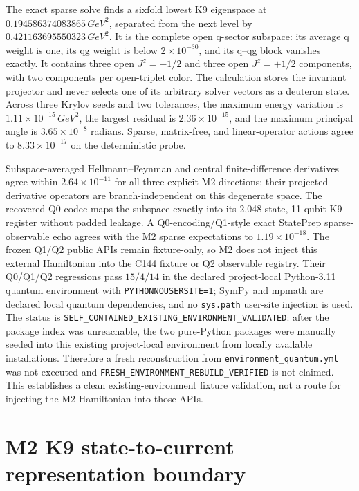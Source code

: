 \documentclass[11pt,oneside]{book}
\newcommand{\codepath}[1]{\nolinkurl{#1}}
\begin{document}
The exact sparse solve finds a sixfold lowest K9 eigenspace at
$0.194586374083865\,\unit{GeV^2}$, separated from the next level by
$0.421163695550323\,\unit{GeV^2}$. It is the complete open q-sector
subspace: its average q weight is one, its qg weight is below $2\times10^{-30}$,
and its q--qg block vanishes exactly. It contains three open
$J^z=-1/2$ and three open $J^z=+1/2$ components, with two components per
open-triplet color. The calculation stores the invariant projector and never
selects one of its arbitrary solver vectors as a deuteron state. Across three
Krylov seeds and two tolerances, the maximum energy variation is
$1.11\times10^{-15}\,\unit{GeV^2}$, the largest residual is
$2.36\times10^{-15}$, and the maximum principal angle is
$3.65\times10^{-8}$ radians. Sparse, matrix-free, and linear-operator
actions agree to $8.33\times10^{-17}$ on the deterministic probe.

Subspace-averaged Hellmann--Feynman and central finite-difference derivatives
agree within $2.64\times10^{-11}$ for all three explicit M2 directions; their
projected derivative operators are branch-independent on this degenerate
space. The recovered Q0 codec maps the subspace exactly into its 2,048-state,
11-qubit K9 register without padded leakage. A Q0-encoding/Q1-style exact
StatePrep sparse-observable echo agrees with the M2 sparse expectations to
$1.19\times10^{-18}$. The frozen Q1/Q2 public APIs remain fixture-only, so
M2 does not inject this external Hamiltonian into the C144 fixture or Q2
observable registry. Their Q0/Q1/Q2 regressions pass $15/4/14$ in the declared
project-local Python-3.11 quantum environment with \texttt{PYTHONNOUSERSITE=1};
SymPy and mpmath are declared local quantum dependencies, and no
\texttt{sys.path} user-site injection is used. The status is
\texttt{SELF\_CONTAINED\_EXISTING\_ENVIRONMENT\_VALIDATED}: after the
package index was unreachable, the two pure-Python packages were manually
seeded into this existing project-local environment from locally available
installations. Therefore a fresh reconstruction from
\codepath{environment_quantum.yml} was not executed and
\texttt{FRESH\_ENVIRONMENT\_REBUILD\_VERIFIED} is not claimed. This
establishes a clean existing-environment fixture validation, not a route for
injecting the M2 Hamiltonian into those APIs.

\section{M2 K9 state-to-current representation boundary}
\label{sec:m2-state-current-boundary}
\end{document}
